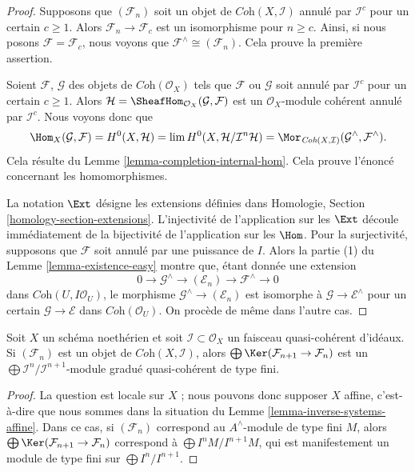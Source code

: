 \begin{proof}
Supposons que $(\mathcal{F}_n)$ soit un objet de $\textit{Coh}(X, \mathcal{I})$
annulé par $\mathcal{I}^c$ pour un certain $c \geq 1$. Alors
$\mathcal{F}_n \to \mathcal{F}_c$ est un isomorphisme pour $n \geq c$.
Ainsi, si nous posons $\mathcal{F} = \mathcal{F}_c$, nous voyons que
$\mathcal{F}^\wedge \cong (\mathcal{F}_n)$. Cela prouve la première assertion.

\medskip\noindent
Soient $\mathcal{F}$, $\mathcal{G}$ des objets de $\textit{Coh}(\mathcal{O}_X)$
tels que $\mathcal{F}$ ou $\mathcal{G}$ soit annulé par
$\mathcal{I}^c$ pour un certain $c \geq 1$. Alors
$\mathcal{H} = \SheafHom_{\mathcal{O}_X}(\mathcal{G}, \mathcal{F})$
est un $\mathcal{O}_X$-module cohérent annulé par $\mathcal{I}^c$.
Nous voyons donc que
$$
\Hom_X(\mathcal{G}, \mathcal{F}) =
H^0(X, \mathcal{H}) =
\lim H^0(X, \mathcal{H}/\mathcal{I}^n\mathcal{H}) =
\Mor_{\textit{Coh}(X, \mathcal{I})}
(\mathcal{G}^\wedge, \mathcal{F}^\wedge).
$$
Cela résulte du Lemme \ref{lemma-completion-internal-hom}.
Cela prouve l'énoncé concernant les homomorphismes.

\medskip\noindent
La notation $\Ext$ désigne les extensions définies dans
Homologie, Section \ref{homology-section-extensions}.
L'injectivité de l'application sur les $\Ext$ découle immédiatement
de la bijectivité de l'application sur les $\Hom$.
Pour la surjectivité, supposons que $\mathcal{F}$ soit annulé
par une puissance de $I$. Alors la partie (1) du Lemme \ref{lemma-existence-easy}
montre que, étant donnée une extension
$$
0 \to \mathcal{G}^\wedge \to (\mathcal{E}_n) \to \mathcal{F}^\wedge \to 0
$$
dans $\textit{Coh}(U, I\mathcal{O}_U)$,
le morphisme $\mathcal{G}^\wedge \to (\mathcal{E}_n)$ est
isomorphe à $\mathcal{G} \to \mathcal{E}^\wedge$
pour un certain $\mathcal{G} \to \mathcal{E}$ dans $\textit{Coh}(\mathcal{O}_U)$.
On procède de même dans l'autre cas.
\end{proof}

\begin{lemma}
\label{lemma-finite-over-rees-algebra}
Soit $X$ un schéma noethérien et soit $\mathcal{I} \subset \mathcal{O}_X$
un faisceau quasi-cohérent d'idéaux. Si $(\mathcal{F}_n)$ est un objet de
$\textit{Coh}(X, \mathcal{I})$, alors
$\bigoplus \Ker(\mathcal{F}_{n + 1} \to \mathcal{F}_n)$ est
un $\bigoplus \mathcal{I}^n/\mathcal{I}^{n + 1}$-module
gradué quasi-cohérent de type fini.
\end{lemma}

\begin{proof}
La question est locale sur $X$ ; nous pouvons donc supposer $X$ affine, c'est-à-dire
que nous sommes dans la situation du Lemme \ref{lemma-inverse-systems-affine}.
Dans ce cas, si $(\mathcal{F}_n)$ correspond au $A^\wedge$-module de type fini
$M$, alors $\bigoplus \Ker(\mathcal{F}_{n + 1} \to \mathcal{F}_n)$
correspond à $\bigoplus I^nM/I^{n + 1}M$, qui est manifestement un module de type fini
sur $\bigoplus I^n/I^{n + 1}$.
\end{proof}

